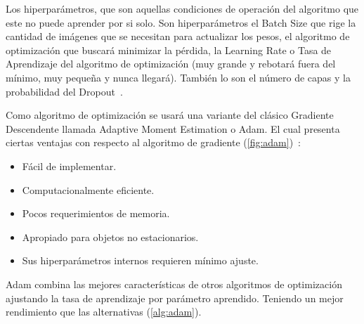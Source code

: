 Los hiperparámetros, que son aquellas condiciones de operación del algoritmo que
este no puede aprender por si solo. Son hiperparámetros el Batch Size que rige
la cantidad de imágenes que se necesitan para actualizar los pesos, el algoritmo
de optimización que buscará minimizar la pérdida, la Learning Rate o Tasa de
Aprendizaje del algoritmo de optimización (muy grande y rebotará fuera del
mínimo, muy pequeña y nunca llegará). También lo son el número de capas y la
probabilidad del Dropout~\cite{Goodfellow2016}.

Como algoritmo de optimización se usará una variante del clásico Gradiente
Descendente llamada Adaptive Moment Estimation o Adam. El cual presenta ciertas
ventajas con respecto al algoritmo de gradiente (\autoref{fig:adam})~\cite{Kingma2014}:

\begin{itemize}
    \item Fácil de implementar.
    \item Computacionalmente eficiente.
    \item Pocos requerimientos de memoria.
    \item Apropiado para objetos no estacionarios.
    \item Sus hiperparámetros internos requieren mínimo ajuste.
\end{itemize}

Adam combina las mejores características de otros algoritmos de optimización
ajustando la tasa de aprendizaje por parámetro aprendido. Teniendo un mejor
rendimiento que las alternativas (\autoref{alg:adam}).

